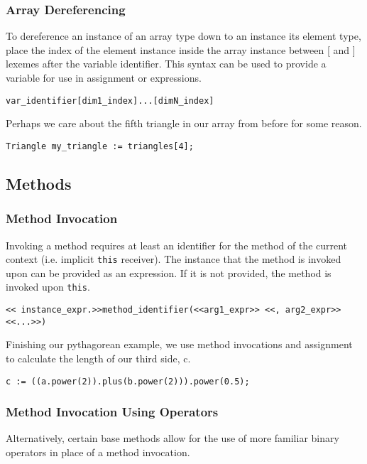 \subsubsection{Array Dereferencing}
To dereference an instance of an array type down to an instance its element type, place the index of the element instance inside the array instance between [ and ] lexemes after the variable identifier. This syntax can be used to provide a variable for use in assignment or expressions.

\begin{lstlisting}
var_identifier[dim1_index]...[dimN_index]
\end{lstlisting}

Perhaps we care about the fifth triangle in our array from before for some reason.

\begin{lstlisting}[caption=Array Dereferencing a Triangle, backgroundcolor=\color{tintedorange}]
Triangle my_triangle := triangles[4];
\end{lstlisting}


\subsection{Methods}
\subsubsection{Method Invocation}
Invoking a method requires at least an identifier for the method of the current context (i.e. implicit \verb!this! receiver). The instance that the method is invoked upon can be provided as an expression. If it is not provided, the method is invoked upon \verb!this!.

\begin{lstlisting}
<< instance_expr.>>method_identifier(<<arg1_expr>> <<, arg2_expr>> <<...>>)
\end{lstlisting}

Finishing our pythagorean example, we use method invocations and assignment to calculate the length of our third side, c.

\begin{lstlisting}[backgroundcolor=\color{tintedorange},caption=Method Invocation for the Pythagorean Theorem Using Methods]
c := ((a.power(2)).plus(b.power(2))).power(0.5);
\end{lstlisting}

\subsubsection{Method Invocation Using Operators}
Alternatively, certain base methods allow for the use of more familiar binary operators in place of a method invocation.

